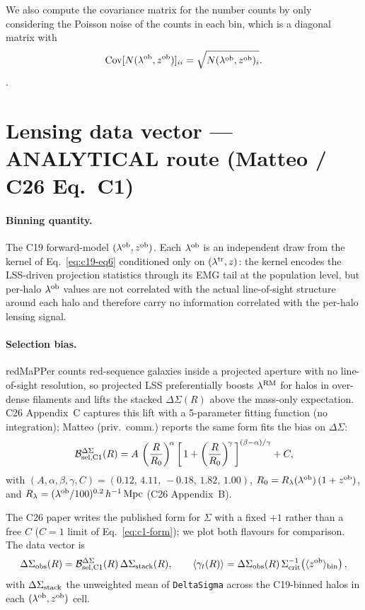 \documentclass[a4paper, 11pt]{article}
\newcommand{\lob}{\lambda^{\rm ob}}
\newcommand{\ltr}{\lambda^{\rm tr}}
\newcommand{\lrm}{\lambda^{\rm RM}}
\newcommand{\zob}{z^{\rm ob}}
\newcommand{\hMpc}{h^{-1}\,\mathrm{Mpc}}
\newcommand{\Bcal}{\mathcal{B}}
\newcommand{\blk}[1]{\textcolor{datablockcol}{\texttt{#1}}}
\begin{document}
We also compute the covariance matrix for the number counts by only considering the Poisson noise of the counts in each bin, which is a diagonal matrix with
\begin{equation}
  \mathrm{Cov}[N(\lob, \zob)]_{ii} = \sqrt{N(\lob, \zob)_i}.
\end{equation}.

\section{Lensing data vector --- ANALYTICAL route (Matteo / C26 Eq.~C1)}
\label{sec:c1}

\paragraph{Binning quantity.} The C19 forward-model $(\lob, \zob)$.
Each $\lob$ is an independent draw from the kernel of
Eq.~\ref{eq:c19-eq6} conditioned only on $(\ltr, z)$: the kernel
encodes the LSS-driven projection statistics through its EMG tail at
the population level, but per-halo $\lob$ values are not correlated
with the actual line-of-sight structure around each halo and therefore
carry no information correlated with the per-halo lensing signal.

\paragraph{Selection bias.} redMaPPer counts red-sequence galaxies inside
a projected aperture with no line-of-sight resolution, so projected LSS
preferentially boosts $\lrm$ for halos in over-dense filaments and lifts
the stacked $\Delta\Sigma(R)$ above the mass-only expectation. C26
Appendix~C captures this lift with a 5-parameter fitting function (no
integration); Matteo (priv.\ comm.) reports the same form fits the bias
on $\Delta\Sigma$:
\begin{equation}
\label{eq:c1-form}
  \Bcal_{\rm sel,C1}^{\Delta\Sigma}(R)
  = A\,\left(\frac{R}{R_0}\right)^{\!\alpha}
    \left[\,1 + \left(\frac{R}{R_0}\right)^{\!\gamma}\,\right]^{(\beta - \alpha)/\gamma}
    + C,
\end{equation}
with $(A, \alpha, \beta, \gamma, C) = (0.12,\, 4.11,\, -0.18,\, 1.82,\, 1.00)$,
$R_0 = R_\lambda(\lob)\,(1+\zob)$, and
$R_\lambda = (\lob/100)^{0.2}\,\hMpc$ (C26 Appendix~B).

The C26 paper writes the published form for $\Sigma$ with a fixed $+1$
rather than a free $C$ ($C = 1$ limit of Eq.~\ref{eq:c1-form}); we plot
both flavours for comparison. The data vector is
\begin{equation}
  \label{eq:c1-data-vector}
  \Delta\Sigma_{\rm obs}(R) = \Bcal_{\rm sel,C1}^{\Delta\Sigma}(R)\,
    \Delta\Sigma_{\rm stack}(R),\qquad
  \langle \gamma_t(R) \rangle = \Delta\Sigma_{\rm obs}(R)\,
    \Sigma_{\rm crit}^{-1}\!\left(\langle\zob\rangle_{\rm bin}\right),
\end{equation}
with $\Delta\Sigma_{\rm stack}$ the unweighted mean of \blk{DeltaSigma}
across the C19-binned halos in each $(\lob, \zob)$ cell.
\end{document}

